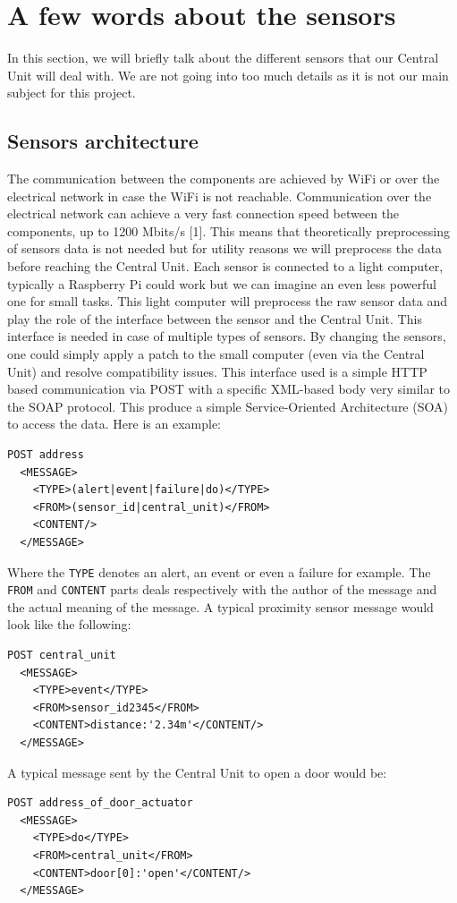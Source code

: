 \documentclass{acm_proc_article-sp}
\begin{document}
\section{A few words about the sensors}
In this section, we will briefly talk about the different sensors that our Central Unit will deal with. 
We are not going into too much details as it is not our main subject for this project.
\subsection{Sensors architecture}
The communication between the components are achieved by WiFi or over the electrical network in case the WiFi is not reachable. 
Communication over the electrical network can achieve a very fast connection speed between the components, up to 1200 Mbits/s [1]. %
This means that theoretically preprocessing of sensors data is not needed but for utility reasons we will preprocess the data before reaching the Central Unit.
Each sensor is connected to a light computer, typically a Raspberry Pi could work but we can imagine an even less powerful one for small tasks. 
This light computer will preprocess the raw sensor data and play the role of the interface between the sensor and the Central Unit. 
This interface is needed in case of multiple types of sensors. By changing the sensors, one could simply apply a patch to the small computer (even via the Central Unit) and resolve compatibility issues. 
This interface used is a simple HTTP based communication via POST with a specific XML-based body very similar to the SOAP protocol. 
This produce a simple Service-Oriented Architecture (SOA) to access the data. 
Here is an example:
\begin{verbatim}
POST address 
  <MESSAGE>
    <TYPE>(alert|event|failure|do)</TYPE>
    <FROM>(sensor_id|central_unit)</FROM>
    <CONTENT/>
  </MESSAGE>
\end{verbatim}
Where the \texttt{TYPE} denotes an alert, an event or even a failure for example. 
The \texttt{FROM} and \texttt{CONTENT} parts deals respectively with the author of the message and the actual meaning of the message. 
A typical proximity sensor message would look like the following:
\begin{verbatim}
POST central_unit 
  <MESSAGE>
    <TYPE>event</TYPE>
    <FROM>sensor_id2345</FROM>
    <CONTENT>distance:'2.34m'</CONTENT/>
  </MESSAGE>
\end{verbatim}
A typical message sent by the Central Unit to open a door would be:
\begin{verbatim}
POST address_of_door_actuator
  <MESSAGE>
    <TYPE>do</TYPE>
    <FROM>central_unit</FROM>
    <CONTENT>door[0]:'open'</CONTENT/>
  </MESSAGE> 
\end{verbatim}
\end{document}
